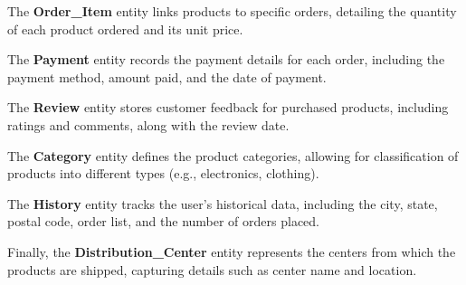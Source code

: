 \documentclass[a4paper,12pt]{article}
\begin{document}
    The \textbf{Order\_Item} entity links products to specific orders, detailing the quantity of each product ordered and its unit price.

    The \textbf{Payment} entity records the payment details for each order, including the payment method, amount paid, and the date of payment.

    The \textbf{Review} entity stores customer feedback for purchased products, including ratings and comments, along with the review date.

    The \textbf{Category} entity defines the product categories, allowing for classification of products into different types (e.g., electronics, clothing).

    The \textbf{History} entity tracks the user's historical data, including the city, state, postal code, order list, and the number of orders placed.

    Finally, the \textbf{Distribution\_Center} entity represents the centers from which the products are shipped, capturing details such as center name and location.
\end{document}
